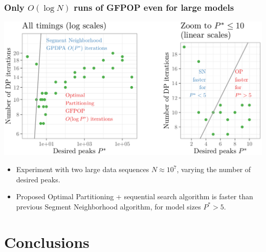 \documentclass[t]{beamer}
\begin{document}
\begin{frame}
  \frametitle{Only $O(\log N)$ runs of GFPOP even for large models}
  \includegraphics[width=\textwidth]{jss-figure-8}

  \begin{itemize}
  \item Experiment with two large data sequences $N\approx 10^7$,
    varying the number of desired peaks.
  \item Proposed Optimal Partitioning + sequential search
    algorithm is faster than previous Segment
    Neighborhood algorithm, for model sizes $P^*>5$.
  \end{itemize}
  
\end{frame}

\section{Conclusions}
\end{document}
